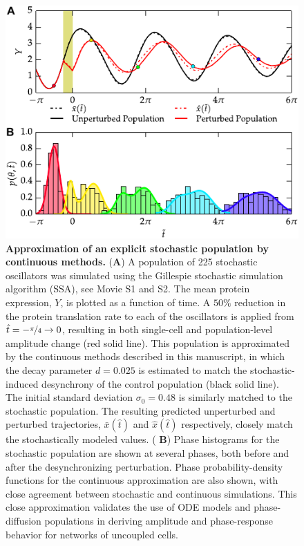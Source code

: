 \documentclass[11pt, letterpaper]{article}
\begin{document}
\begin{figure}[h!]
  \begin{center}
    \includegraphics[width=.75\textwidth]{figures/figure_S2.pdf}
    \caption{{\bfseries Approximation of an explicit stochastic population by
    continuous methods.} ({\bfseries A}) A population of 225 stochastic
    oscillators was simulated using the Gillespie stochastic simulation
    algorithm (SSA), see Movie S1 and S2. The mean protein
    expression, $Y$, is plotted as a function of time. A $50\%$ reduction in
    the protein translation rate to each of the oscillators is applied from
    $\hat{t} = -\nicefrac{\pi}{4} \to 0$, resulting in both single-cell and
    population-level amplitude change (red solid line). This population is
    approximated by the continuous methods described in this manuscript, in
    which the decay parameter $d=0.025$ is estimated to match the
    stochastic-induced desynchrony of the control population (black solid
    line). The initial standard deviation $\sigma_0 = 0.48$ is similarly
    matched to the stochastic population. The resulting predicted unperturbed
    and perturbed trajectories, $\bar{x}(\hat{t})$ and $\hat{x}(\hat{t})$
    respectively, closely match the stochastically modeled values.  ({\bfseries
    B}) Phase histograms for the stochastic population are shown at several
    phases, both before and after the desynchronizing perturbation.  Phase
    probability-density functions for the continuous approximation are also
    shown, with close agreement between stochastic and continuous simulations.
    This close approximation validates the use of ODE models and
  phase-diffusion populations in deriving amplitude and phase-response behavior
for networks of uncoupled cells.}
\end{center}
\end{figure}
\end{document}
